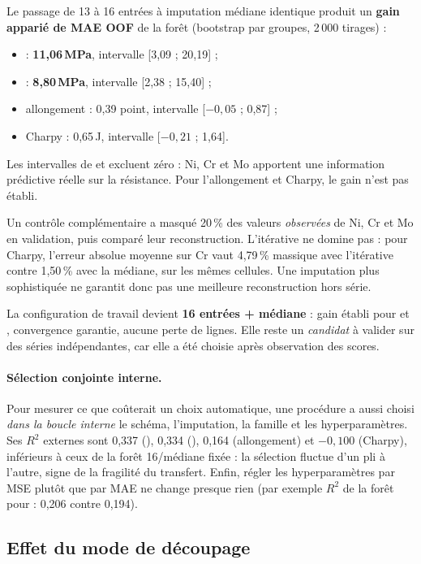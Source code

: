 Le passage de 13 à 16 entrées à imputation médiane identique produit un
\textbf{gain apparié de MAE OOF} de la forêt (bootstrap par groupes, 2\,000 tirages) :
\begin{itemize}
  \item \YS{} : \textbf{11,06\,MPa}, intervalle [3,09 ; 20,19] ;
  \item \UTS{} : \textbf{8,80\,MPa}, intervalle [2,38 ; 15,40] ;
  \item allongement : 0,39 point, intervalle [$-0{,}05$ ; 0,87] ;
  \item Charpy : 0,65\,J, intervalle [$-0{,}21$ ; 1,64].
\end{itemize}
Les intervalles de \YS{} et \UTS{} excluent zéro : Ni, Cr et Mo apportent une
information prédictive réelle sur la résistance. Pour l'allongement et Charpy,
le gain n'est pas établi.

Un contrôle complémentaire a masqué 20\,\% des valeurs \emph{observées} de Ni,
Cr et Mo en validation, puis comparé leur reconstruction. L'itérative ne domine
pas : pour Charpy, l'erreur absolue moyenne sur Cr vaut 4,79\,\% massique avec
l'itérative contre 1,50\,\% avec la médiane, sur les mêmes cellules. Une
imputation plus sophistiquée ne garantit donc pas une meilleure reconstruction
hors série.

\begin{decision}
La configuration de travail devient \textbf{16 entrées + médiane} : gain établi
pour \YS{} et \UTS, convergence garantie, aucune perte de lignes. Elle reste un
\emph{candidat} à valider sur des séries indépendantes, car elle a été choisie
après observation des scores.
\end{decision}

\paragraph{Sélection conjointe interne.} Pour mesurer ce que coûterait un choix
automatique, une procédure a aussi choisi \emph{dans la boucle interne} le schéma,
l'imputation, la famille et les hyperparamètres. Ses $R^2$ externes sont 0,337
(\YS), 0,334 (\UTS), 0,164 (allongement) et $-0{,}100$ (Charpy), inférieurs à ceux
de la forêt 16/médiane fixée : la sélection fluctue d'un pli à l'autre, signe
de la fragilité du transfert. Enfin, régler les hyperparamètres par MSE plutôt
que par MAE ne change presque rien (par exemple $R^2$ de la forêt pour \UTS{} :
0,206 contre 0,194).

\subsection{Effet du mode de découpage}
\label{subsec:decoupages}

